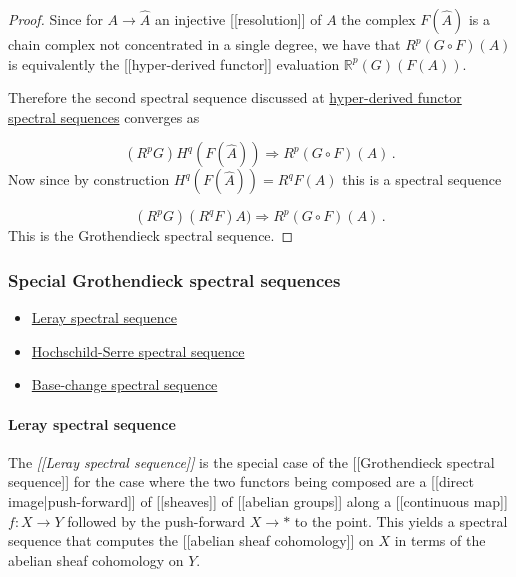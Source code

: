 \documentclass[12pt,titlepage]{article}
\theoremstyle{plain}
\theoremstyle{definition}
\theoremstyle{remark}
\begin{document}
\begin{proof}
Since for $A \to \hat A$ an injective [[resolution]] of $A$ the complex $F(\hat A)$ is a chain complex not concentrated in a single degree, we have that $R^p (G \circ F)(A)$ is equivalently the [[hyper-derived functor]] evaluation $\mathbb{R}^p(G) (F(A))$.

Therefore the second spectral sequence discussed at \hyperlink{HyperDerivedFunctors}{hyper-derived functor spectral sequences} converges as

\begin{displaymath}
(R^p G)H^q(F(\hat A)) \Rightarrow R^p (G \circ F)(A)
  \,.
\end{displaymath}
Now since by construction $H^q(F(\hat A)) = R^q F(A)$ this is a spectral sequence

\begin{displaymath}
(R^p G)(R^q F) A) \Rightarrow R^p (G \circ F)(A)
  \,.
\end{displaymath}
This is the Grothendieck spectral sequence.

\end{proof}
\hypertarget{SpecialGrothendieckSpectralSequence}{}\subsubsection*{{Special Grothendieck spectral sequences}}\label{SpecialGrothendieckSpectralSequence}

\begin{itemize}%
\item \hyperlink{LeraySpectralSequence}{Leray spectral sequence}


\item \hyperlink{HochschildSerreSpectralSequence}{Hochschild-Serre spectral sequence}


\item \hyperlink{BaseChangeSpectralSequence}{Base-change spectral sequence}



\end{itemize}
\hypertarget{LeraySpectralSequence}{}\paragraph*{{Leray spectral sequence}}\label{LeraySpectralSequence}

The \emph{[[Leray spectral sequence]]} is the special case of the [[Grothendieck spectral sequence]] for the case where the two functors being composed are a [[direct image|push-forward]] of [[sheaves]] of [[abelian groups]] along a [[continuous map]] $f : X \to Y$ followed by the push-forward $X \to *$ to the point. This yields a spectral sequence that computes the [[abelian sheaf cohomology]] on $X$ in terms of the abelian sheaf cohomology on $Y$.
\end{document}
